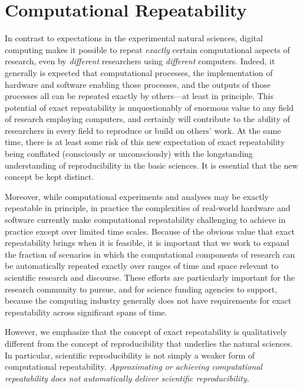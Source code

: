 \section{Computational Repeatability}\label{sec-repeatability}

In contrast to expectations in the experimental natural sciences, digital computing makes it 
	possible to repeat \emph{exactly} certain computational aspects of research, even by \emph{different} 
	researchers using \emph{different} computers.  
Indeed, it generally is expected that computational processes, the implementation of hardware and software 
	enabling those processes, and the outputs of those processes all can be repeated exactly by others---at least in principle.
This potential of exact repeatability is unquestionably of enormous value to any field of research employing computers,
	and certainly will contribute to the ability of researchers in every field to reproduce or build on others' work.
At the same time, there is at least some risk of this new expectation of exact repeatability being conflated 
	(consciously or unconsciously) with the longstanding understanding of reproducibility in the basic sciences. 
It is essential that the new concept be kept distinct.

Moreover, while computational experiments and analyses may be exactly repeatable in principle, 
	in practice the complexities of real-world hardware and software currently make computational repeatability 
	challenging to achieve in practice except over limited time scales.
Because of the obvious value that exact repeatability brings when it is feasible, it is important that we work to
	expand the fraction of scenarios in which the computational components of research can be automatically 
	repeated exactly over ranges of time and space relevant to scientific research and discourse.
These efforts are particularly important for the research community to pursue, and for science funding
	agencies to support, because the computing industry generally does not have requirements for exact 
	repeatability across significant spans of time.

However, we emphasize that the concept of exact repeatability is 
	qualitatively different from the concept of reproducibility that underlies the natural sciences.
In particular, scientific reproducibility is not simply a weaker form of computational repeatability.  
\emph{Approximating or achieving computational repeatability does not automatically deliver scientific reproducibility.}

